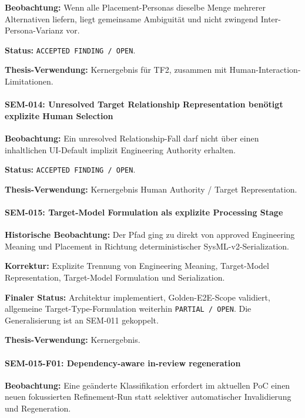 \textbf{Beobachtung:}
Wenn alle Placement-Personas dieselbe Menge mehrerer Alternativen liefern, liegt
gemeinsame Ambiguität und nicht zwingend Inter-Persona-Varianz vor.

\textbf{Status:}
\texttt{ACCEPTED FINDING / OPEN}.

\textbf{Thesis-Verwendung:}
Kernergebnis für TF2, zusammen mit Human-Interaction-Limitationen.


\paragraph{SEM-014: Unresolved Target Relationship Representation benötigt explizite Human Selection}

\textbf{Beobachtung:}
Ein unresolved Relationship-Fall darf nicht über einen inhaltlichen UI-Default
implizit Engineering Authority erhalten.

\textbf{Status:}
\texttt{ACCEPTED FINDING / OPEN}.

\textbf{Thesis-Verwendung:}
Kernergebnis Human Authority / Target Representation.


\paragraph{SEM-015: Target-Model Formulation als explizite Processing Stage}

\textbf{Historische Beobachtung:}
Der Pfad ging zu direkt von approved Engineering Meaning und Placement in Richtung
deterministischer SysML-v2-Serialization.

\textbf{Korrektur:}
Explizite Trennung von Engineering Meaning, Target-Model Representation,
Target-Model Formulation und Serialization.

\textbf{Finaler Status:}
Architektur implementiert, Golden-E2E-Scope validiert, allgemeine
Target-Type-Formulation weiterhin \texttt{PARTIAL / OPEN}. Die Generalisierung ist
an SEM-011 gekoppelt.

\textbf{Thesis-Verwendung:}
Kernergebnis.


\paragraph{SEM-015-F01: Dependency-aware in-review regeneration}

\textbf{Beobachtung:}
Eine geänderte Klassifikation erfordert im aktuellen PoC einen neuen fokussierten
Refinement-Run statt selektiver automatischer Invalidierung und Regeneration.

